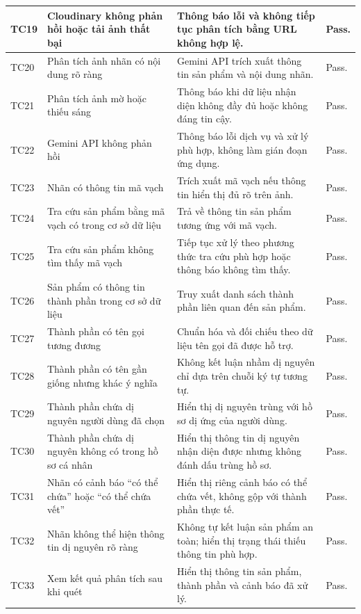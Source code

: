 \begin{longtable}{|>{\centering\arraybackslash}p{0.8cm}|>{\raggedright\arraybackslash}p{3.1cm}|>{\raggedright\arraybackslash}p{8.2cm}|>{\raggedright\arraybackslash}p{2.2cm}|}
	TC19 & Cloudinary không phản hồi hoặc tải ảnh thất bại & Thông báo lỗi và không tiếp tục phân tích bằng URL không hợp lệ. & Pass. \\ \hline
	TC20 & Phân tích ảnh nhãn có nội dung rõ ràng & Gemini API trích xuất thông tin sản phẩm và nội dung nhãn. & Pass. \\ \hline
	TC21 & Phân tích ảnh mờ hoặc thiếu sáng & Thông báo khi dữ liệu nhận diện không đầy đủ hoặc không đáng tin cậy. & Pass. \\ \hline
	TC22 & Gemini API không phản hồi & Thông báo lỗi dịch vụ và xử lý phù hợp, không làm gián đoạn ứng dụng. & Pass. \\ \hline
	TC23 & Nhãn có thông tin mã vạch & Trích xuất mã vạch nếu thông tin hiển thị đủ rõ trên ảnh. &Pass. \\ \hline
	TC24 & Tra cứu sản phẩm bằng mã vạch có trong cơ sở dữ liệu & Trả về thông tin sản phẩm tương ứng với mã vạch. & Pass. \\ \hline
	TC25 & Tra cứu sản phẩm không tìm thấy mã vạch & Tiếp tục xử lý theo phương thức tra cứu phù hợp hoặc thông báo không tìm thấy. & Pass. \\ \hline
	TC26 & Sản phẩm có thông tin thành phần trong cơ sở dữ liệu & Truy xuất danh sách thành phần liên quan đến sản phẩm. & Pass. \\ \hline
	TC27 & Thành phần có tên gọi tương đương & Chuẩn hóa và đối chiếu theo dữ liệu tên gọi đã được hỗ trợ. & Pass. \\ \hline
	TC28 & Thành phần có tên gần giống nhưng khác ý nghĩa & Không kết luận nhầm dị nguyên chỉ dựa trên chuỗi ký tự tương tự. & Pass. \\ \hline
	TC29 & Thành phần chứa dị nguyên người dùng đã chọn & Hiển thị dị nguyên trùng với hồ sơ dị ứng của người dùng. & Pass. \\ \hline
	TC30 & Thành phần chứa dị nguyên không có trong hồ sơ cá nhân & Hiển thị thông tin dị nguyên nhận diện được nhưng không đánh dấu trùng hồ sơ. & Pass. \\ \hline
	TC31 & Nhãn có cảnh báo ``có thể chứa'' hoặc ``có thể chứa vết'' & Hiển thị riêng cảnh báo có thể chứa vết, không gộp với thành phần thực tế. & Pass. \\ \hline
	TC32 & Nhãn không thể hiện thông tin dị nguyên rõ ràng & Không tự kết luận sản phẩm an toàn; hiển thị trạng thái thiếu thông tin phù hợp. & Pass. \\ \hline
	TC33 & Xem kết quả phân tích sau khi quét & Hiển thị thông tin sản phẩm, thành phần và cảnh báo đã xử lý. & Pass. \\ \hline

\end{longtable}

